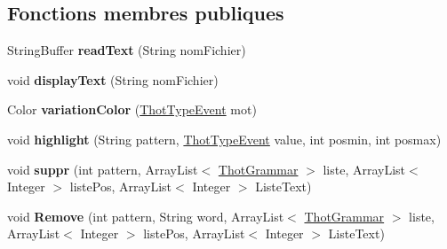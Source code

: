 \subsection*{Fonctions membres publiques}
\begin{DoxyCompactItemize}
\item 
\mbox{\label{classfr_1_1irit_1_1elipse_1_1project_1_1_thot_text_adf0e64f3a9ce5283ca3eb19b90defd95}} 
String\+Buffer {\bfseries read\+Text} (String nom\+Fichier)
\item 
\mbox{\label{classfr_1_1irit_1_1elipse_1_1project_1_1_thot_text_aa2caf0938652438bbaf5a31db90e013e}} 
void {\bfseries display\+Text} (String nom\+Fichier)
\item 
\mbox{\label{classfr_1_1irit_1_1elipse_1_1project_1_1_thot_text_aa3d3e74c18e3f218e7b66827baade34e}} 
Color {\bfseries variation\+Color} (\mbox{\hyperlink{enumfr_1_1irit_1_1elipse_1_1project_1_1_thot_type_event}{Thot\+Type\+Event}} mot)
\item 
\mbox{\label{classfr_1_1irit_1_1elipse_1_1project_1_1_thot_text_a74a5dbd7f18bbf2e13dc9501789f0708}} 
void {\bfseries highlight} (String pattern, \mbox{\hyperlink{enumfr_1_1irit_1_1elipse_1_1project_1_1_thot_type_event}{Thot\+Type\+Event}} value, int posmin, int posmax)
\item 
\mbox{\label{classfr_1_1irit_1_1elipse_1_1project_1_1_thot_text_a5ad1b008bcfea681f2c681cd95de25a4}} 
void {\bfseries suppr} (int pattern, Array\+List$<$ \mbox{\hyperlink{classfr_1_1irit_1_1elipse_1_1project_1_1_thot_grammar}{Thot\+Grammar}} $>$ liste, Array\+List$<$ Integer $>$ liste\+Pos, Array\+List$<$ Integer $>$ Liste\+Text)
\item 
\mbox{\label{classfr_1_1irit_1_1elipse_1_1project_1_1_thot_text_a6e868d3d96d1ee84c62e0778ac8a4d20}} 
void {\bfseries Remove} (int pattern, String word, Array\+List$<$ \mbox{\hyperlink{classfr_1_1irit_1_1elipse_1_1project_1_1_thot_grammar}{Thot\+Grammar}} $>$ liste, Array\+List$<$ Integer $>$ liste\+Pos, Array\+List$<$ Integer $>$ Liste\+Text)
\end{DoxyCompactItemize}
